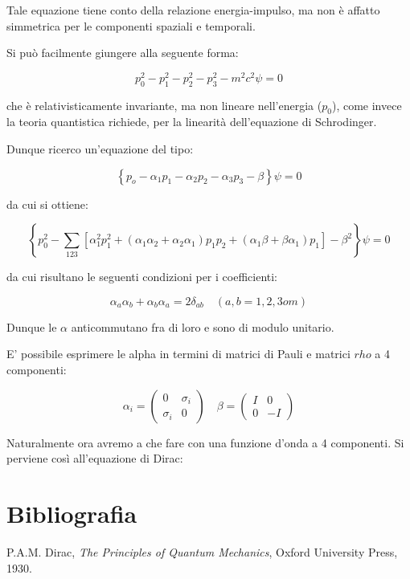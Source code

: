 \documentclass{report}
\begin{document}
Tale equazione tiene conto della relazione energia-impulso, ma non è affatto simmetrica per le componenti spaziali e temporali.

Si può facilmente giungere alla seguente forma:

\begin{equation}
  {p_0^2-p_1^2-p_2^2-p_3^2-m^2c^2}\psi=0
\end{equation}

che è relativisticamente invariante, ma non lineare nell'energia ($p_0$), come invece la teoria quantistica richiede, per la linearità dell'equazione di Schrodinger.

Dunque ricerco un'equazione del tipo:

\begin{equation}
  \left\{p_o-\alpha_1p_1-\alpha_2p_2-\alpha_3p_3-\beta\right\}\psi=0
\end{equation}

da cui si ottiene:

\begin{equation}
  \left\{p_0^2-\sum_{123}[\alpha_1^2p_1^2+(\alpha_1\alpha_2+\alpha_2\alpha_1)p_1p_2+(\alpha_1\beta+\beta\alpha_1)p_1]-\beta^2\right\}\psi=0
\end{equation}

da cui risultano le seguenti condizioni per i coefficienti:

\begin{equation}
  \alpha_a\alpha_b+\alpha_b\alpha_a=2\delta_{ab} \quad (a,b=1,2,3 o m)
\end{equation}

Dunque le $\alpha$ anticommutano fra di loro e sono di modulo unitario.

E' possibile esprimere le alpha in termini di matrici di Pauli e matrici $rho$ a 4 componenti:

\begin{equation}
  \alpha_i=\begin{pmatrix}
    0        & \sigma_i \\
    \sigma_i & 0
  \end{pmatrix}
  \quad
  \beta=\begin{pmatrix}
    I & 0  \\
    0 & -I
  \end{pmatrix}
\end{equation}

Naturalmente ora avremo a che fare con una funzione d'onda a 4 componenti.
Si perviene così all'equazione di Dirac:



\section{Bibliografia}
\begin{thebibliography}{9}
   P.A.M. Dirac, \emph{The Principles of Quantum Mechanics}, Oxford University Press, 1930.
\end{thebibliography}
\end{document}

